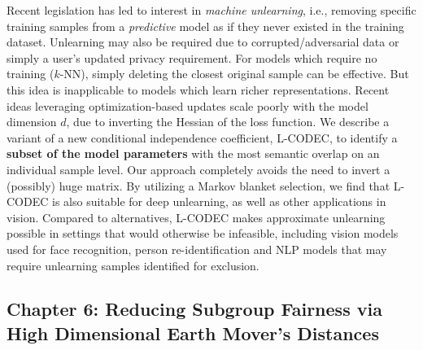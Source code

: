 Recent legislation has
led to interest in {\em machine unlearning}, i.e., removing specific training samples from a {\em predictive} model as if they never existed in the training dataset. 
Unlearning may also be required due to  corrupted/adversarial data or simply a user's updated privacy requirement.
For models which require no training ($k$-NN), 
simply deleting the closest original sample can be effective. 
But this idea is inapplicable to models which learn richer 
representations.
Recent ideas leveraging optimization-based updates
scale poorly with the model dimension $d$,  
due to 
inverting the Hessian of the loss function. %
We describe
a variant of a new conditional independence coefficient, 
L-CODEC, to identify a \textbf{subset of the model parameters} with the most semantic overlap on an individual sample level. 
Our approach completely avoids the need to invert a (possibly) huge matrix. 
By utilizing a Markov blanket selection, 
we find
that L-CODEC is also suitable for deep unlearning,
as well as other applications in vision.
Compared to alternatives, L-CODEC makes approximate unlearning possible 
in settings that would otherwise be infeasible, 
including vision models used for face recognition, 
person re-identification 
and NLP models that may require unlearning samples identified for exclusion.


\subsection{Chapter 6: Reducing Subgroup Fairness via High Dimensional Earth Mover's Distances}

